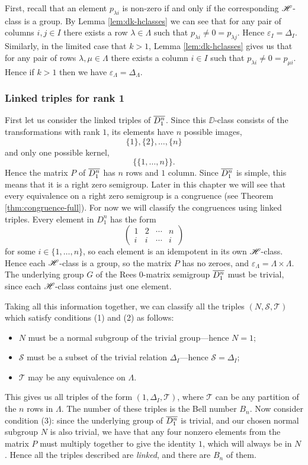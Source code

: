 First, recall that an element $p_{\lambda i}$ is non-zero if and only if the
corresponding $\mathrel{\mathscr{H}}$-class is a group.  By Lemma \ref{lem:dk-hclasses} we can see
that for any pair of columns $i,j \in I$ there exists a row
$\lambda \in \Lambda$ such that $p_{\lambda i} \neq 0 = p_{\lambda j}$.  Hence
$\varepsilon_I = \Delta_I$.  Similarly, in the limited case that $k>1$, Lemma
\ref{lem:dk-hclasses} gives us that for any pair of rows
$\lambda, \mu \in \Lambda$ there exists a column $i \in I$ such that
$p_{\lambda i} \neq 0 = p_{\mu i}$.  Hence if $k>1$ then we have
$\varepsilon_\Lambda = \Delta_\Lambda$.

\subsubsection{Linked triples for rank 1}
\label{sec:k1}
First let us consider the linked triples of $\overline{D_1^n}$.  Since this
$\DD$-class consists of the transformations with rank $1$, its elements have $n$
possible images,
$$\{1\}, \{2\}, \dots, \{n\}$$
and only one possible kernel,
$$\big\{\{1, \dots, n\}\big\}.$$
Hence the matrix $P$ of $\overline{D_1^n}$ has $n$ rows and $1$ column.  Since
$\overline{D_1^n}$ is simple, this means that it is a right zero semigroup.  Later in
this chapter we will see that every equivalence on a right zero semigroup is a
congruence (see Theorem \ref{thm:congruence-full}).  For now we will classify
the congruences using linked triples.  Every element in $D_1^n$ has the form
$$\begin{pmatrix}
  1 & 2 & \cdots & n \\
  i & i & \cdots & i
\end{pmatrix}$$ for some $i \in \{1, \dots, n\}$, so each element is an
idempotent in its own $\mathrel{\mathscr{H}}$-class.  Hence each $\mathrel{\mathscr{H}}$-class is a group, so the
matrix $P$ has no zeroes, and $\varepsilon_\Lambda = \Lambda \times \Lambda$.
The underlying group $G$ of the Rees 0-matrix semigroup $\overline{D_1^n}$ must be
trivial, since each $\mathrel{\mathscr{H}}$-class contains just one element.

Taking all this information together, we can classify all the triples $(N,
\mathcal{S}, \mathcal{T})$ which satisfy conditions (1) and (2) as follows:
\begin{itemize}
\item $N$ must be a normal subgroup of the trivial group---hence $N = 1$;
\item $\mathcal{S}$ must be a subset of the trivial relation $\Delta_I$---hence
  $\mathcal{S} = \Delta_I$;
\item $\mathcal{T}$ may be any equivalence on $\Lambda$.
\end{itemize}
This gives us all triples of the form $(1,\Delta_I,\mathcal{T})$, where
$\mathcal{T}$ can be any partition of the $n$ rows in $\Lambda$.  The number of
these triples is the Bell number $B_n$.  Now consider condition (3): since the
underlying group of $\overline{D_1^n}$ is trivial, and our chosen normal subgroup $N$ is
also trivial, we have that any four nonzero elements from the matrix $P$ must
multiply together to give the identity $1$, which will always be in $N$.  Hence all the
triples described are \textit{linked}, and there are $B_n$ of them.

